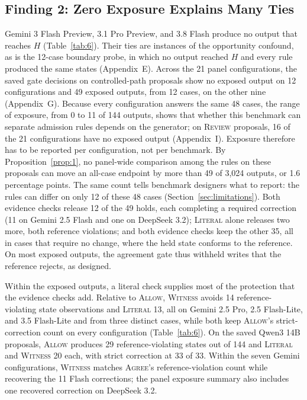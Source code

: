 \documentclass[acmsmall,review,anonymous]{acmart}
\newcommand{\agree}{\textsc{Agree}}
\newcommand{\allow}{\textsc{Allow}}
\newcommand{\literal}{\textsc{Literal}}
\newcommand{\witness}{\textsc{Witness}}
\newcommand{\review}{\textsc{Review}}
\begin{document}
\subsection{Finding 2: Zero Exposure Explains Many Ties}\label{sec:exposure-results}
Gemini 3 Flash Preview, 3.1 Pro Preview, and 3.8 Flash produce no output that reaches $H$ (Table~\ref{tab:6}). Their ties are instances of the opportunity confound, as is the 12-case boundary probe, in which no output reached $H$ and every rule produced the same states (Appendix~E). Across the 21 panel configurations, the saved gate decisions on controlled-path proposals show no exposed output on 12 configurations and 49 exposed outputs, from 12 cases, on the other nine (Appendix~G). Because every configuration answers the same 48 cases, the range of exposure, from 0 to 11 of 144 outputs, shows that whether this benchmark can separate admission rules depends on the generator; on \review{} proposals, 16 of the 21 configurations have no exposed output (Appendix~I). Exposure therefore has to be reported per configuration, not per benchmark. By Proposition~\ref{prop:1}, no panel-wide comparison among the rules on these proposals can move an all-case endpoint by more than 49 of 3,024 outputs, or 1.6 percentage points. The same count tells benchmark designers what to report: the rules can differ on only 12 of these 48 cases (Section~\ref{sec:limitations}). Both evidence checks release 12 of the 49 holds, each completing a required correction (11 on Gemini 2.5 Flash and one on DeepSeek 3.2); \literal{} alone releases two more, both reference violations; and both evidence checks keep the other 35, all in cases that require no change, where the held state conforms to the reference. On most exposed outputs, the agreement gate thus withheld writes that the reference rejects, as designed.

Within the exposed outputs, a literal check supplies most of the protection that the evidence checks add. Relative to \allow{}, \witness{} avoids 14 reference-violating state observations and \literal{} 13, all on Gemini 2.5 Pro, 2.5 Flash-Lite, and 3.5 Flash-Lite and from three distinct cases, while both keep \allow{}'s strict-correction count on every configuration (Table~\ref{tab:6}). On the saved Qwen3 14B proposals, \allow{} produces 29 reference-violating states out of 144 and \literal{} and \witness{} 20 each, with strict correction at 33 of 33. Within the seven Gemini configurations, \witness{} matches \agree{}'s reference-violation count while recovering the 11 Flash corrections; the panel exposure summary also includes one recovered correction on DeepSeek 3.2.
\end{document}
